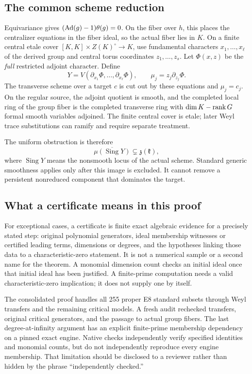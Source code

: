 \subsection{The common scheme reduction}
Equivariance gives $(\operatorname{Ad}(g)-1)\theta(g)=0$. On the fiber over $h$, this places the centralizer equations in the fiber ideal, so the actual fiber lies in $K$. On a finite central etale cover $[K,K]\times Z(K)^\circ\to K$, use fundamental characters $x_1,\ldots,x_\ell$ of the derived group and central torus coordinates $z_1,\ldots,z_s$. Let $\Phi(x,z)$ be the \emph{full} restricted adjoint character. Define
\[
 Y=V(\partial_{x_1}\Phi,\ldots,\partial_{x_\ell}\Phi),\qquad
 \mu_j=z_j\partial_{z_j}\Phi.
\]
The transverse scheme over a target $c$ is cut out by these equations and $\mu_j=c_j$. On the regular source, the adjoint quotient is smooth, and the completed local ring of the group fiber is the completed transverse ring with $\dim K-\operatorname{rank} G$ formal smooth variables adjoined. The finite central cover is etale; later Weyl trace substitutions can ramify and require separate treatment.

The uniform obstruction is therefore
\[
 \overline{\mu(\operatorname{Sing}Y)}\subsetneq\mathfrak z(\mathfrak k),
\]
where $\operatorname{Sing}Y$ means the nonsmooth locus of the actual scheme. Standard generic smoothness applies only after this image is excluded. It cannot remove a persistent nonreduced component that dominates the target.

\subsection{What a certificate means in this proof}
For exceptional cases, a certificate is finite exact algebraic evidence for a precisely stated step: original polynomial generators, ideal membership witnesses or certified leading terms, dimensions or degrees, and the hypotheses linking those data to a characteristic-zero statement. It is not a numerical sample or a second name for the theorem. A monomial dimension count checks an initial ideal once that initial ideal has been justified. A finite-prime computation needs a valid characteristic-zero implication; it does not supply one by itself.

The consolidated proof handles all 255 proper E8 standard subsets through Weyl transfers and the remaining critical models. A fresh audit rechecked transfers, original critical generators, and the passage to actual group fibers. The last degree-at-infinity argument has an explicit finite-prime membership dependency on a pinned exact engine. Native checks independently verify specified identities and monomial counts, but do not independently reproduce every engine membership. That limitation should be disclosed to a reviewer rather than hidden by the phrase ``independently checked.''

